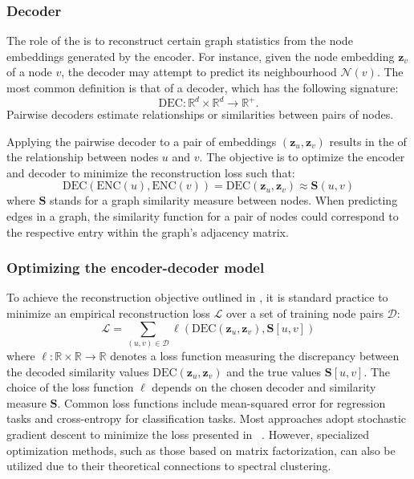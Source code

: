 \subsubsection{Decoder}\label{sec:decoder}
The role of the  is to reconstruct certain graph statistics from the node embeddings generated by the encoder. For instance, given the node embedding $ \mathbf{z}_v $ of a node $ v $, the decoder may attempt to predict its neighbourhood $ \mathcal{N}(v) $. The most common definition is that of a  decoder, which has the following signature:
\begin{equation*}
    \text{DEC}: \mathbb{R}^d \times \mathbb{R}^d \to \mathbb{R}^+.
\end{equation*}
Pairwise decoders estimate relationships or similarities between pairs of nodes. 

Applying the pairwise decoder to a pair of embeddings $ (\mathbf{z}_u, \mathbf{z}_v) $ results in the  of the relationship between nodes $ u $ and $ v $. The objective is to optimize the encoder and decoder to minimize the reconstruction loss such that:
\begin{equation}\label{eq:reconstruction}
    \text{DEC}(\text{ENC}(u), \text{ENC}(v)) = \text{DEC}(\mathbf{z}_u, \mathbf{z}_v) \approx \textbf{S}(u,v)
\end{equation}
where $ \textbf{S} $ stands for a graph similarity measure between nodes. When predicting edges in a graph, the similarity function for a pair of nodes could correspond to the respective entry within the graph's adjacency matrix.

\subsubsection{Optimizing the encoder-decoder model}
To achieve the reconstruction objective outlined in , it is standard practice to minimize an empirical reconstruction loss $ \mathcal{L} $ over a set of training node pairs $ \mathcal{D} $:
\begin{equation}\label{eq:loss}
    \mathcal{L} = \sum_{(u,v)\in\mathcal{D}} \ell(\text{DEC}(\mathbf{z}_u, \mathbf{z}_v), \textbf{S}[u,v])
\end{equation}
where $ \ell: \mathbb{R}\times\mathbb{R}\to\mathbb{R} $ denotes a loss function measuring the discrepancy between the decoded similarity values $ \text{DEC}(\mathbf{z}_u, \mathbf{z}_v) $ and the true values $ \textbf{S}[u,v] $. The choice of the loss function $ \ell $ depends on the chosen decoder and similarity measure $ \textbf{S} $. Common loss functions include mean-squared error for regression tasks and cross-entropy for classification tasks. Most approaches adopt stochastic gradient descent to minimize the loss presented in ~\cite{Robbins1951stochasticApproximation}. However, specialized optimization methods, such as those based on matrix factorization, can also be utilized due to their theoretical connections to spectral clustering.

